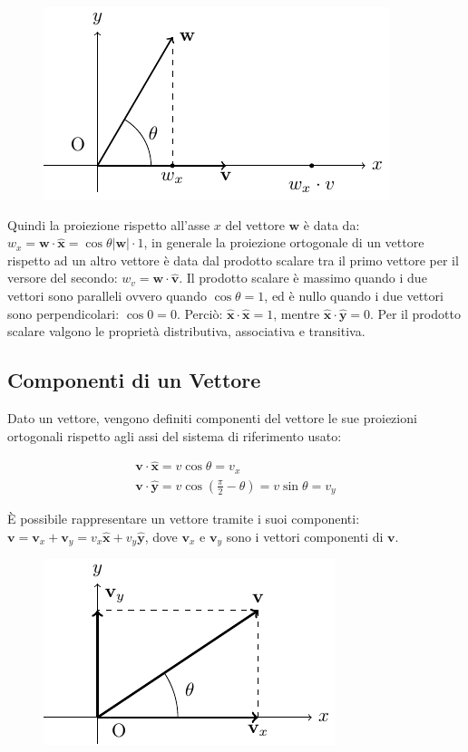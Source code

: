 \documentclass{article}
\newcommand{\vect}[1]{\boldsymbol{\mathbf{#1}}}
\numberwithin{equation}{subsection}
\begin{document}
\begin{figure}[H]%
    \centering
    \includegraphics{prodotto-scalare.pdf}%
\end{figure}

Quindi la proiezione rispetto all'asse $x$ del vettore 
$\vect{w}$ è data da: $w_x = \vect{w}\cdot\hat{\vect{x}}= 
\cos\theta|\vect{w}|\cdot1$, in generale la proiezione 
ortogonale di un vettore rispetto ad un altro vettore è 
data dal prodotto scalare tra il primo vettore per il versore 
del secondo: $w_v = \vect{w}\cdot\hat{\vect{v}}$.
Il prodotto scalare è massimo quando i due vettori sono 
paralleli ovvero quando $\cos\theta = 1$, ed è nullo
quando i due vettori sono perpendicolari: $\cos0 = 0$.
Perciò: $\hat{\vect{x}}\cdot\hat{\vect{x}} = 1$, mentre $\hat{\vect{x}}\cdot\hat{\vect{y}} = 0$. 
Per il prodotto scalare valgono le proprietà distributiva, associativa e
transitiva. 

\subsection{Componenti di un Vettore}
Dato un vettore, vengono definiti componenti del vettore le sue proiezioni ortogonali rispetto agli assi del sistema di riferimento usato:

\begin{gather}
    \vect{v}\cdot\hat{\vect{x}} = v\cos\theta = v_x\\
    \vect{v}\cdot\hat{\vect{y}} = v\cos\left(\displaystyle\frac{\pi}{2} - \theta\right) = v\sin\theta = v_y
\end{gather}

\`{E} possibile rappresentare un vettore tramite i suoi componenti: $\vect{v} = \vect{v}_x + \vect{v}_y = v_x\hat{\vect{x}} + v_y\hat{\vect{y}}$, dove $\vect{v}_x$ e $\vect{v}_y$ sono i vettori componenti di $\vect{v}$.

\begin{figure}[H]%
    \centering
    \includegraphics{componenti-vettore.pdf}%
\end{figure}
\end{document}
